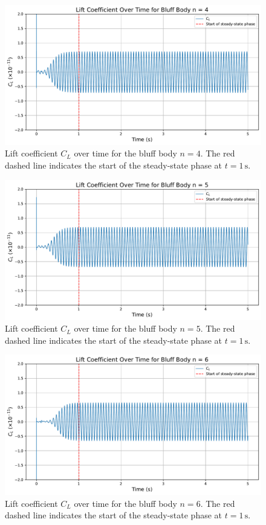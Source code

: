 \begin{figure}[H]
	\centering
	\includegraphics[width=\textwidth]{images/4face_graph}
	\caption{Lift coefficient $C_L$ over time for the bluff body $n=4$. The red dashed line indicates the start of the steady-state phase at $t = 1\,\mathrm{s}$.}
	\label{fig:4FaceGraph} 
\end{figure}

\begin{figure}[H]
	\centering
	\includegraphics[width=\textwidth]{images/5face_graph}
	\caption{Lift coefficient $C_L$ over time for the bluff body $n=5$. The red dashed line indicates the start of the steady-state phase at $t = 1\,\mathrm{s}$.}
	\label{fig:5FaceGraph} 
\end{figure}

\begin{figure}[H]
	\centering
	\includegraphics[width=\textwidth]{images/6face_graph}
	\caption{Lift coefficient $C_L$ over time for the bluff body $n=6$. The red dashed line indicates the start of the steady-state phase at $t = 1\,\mathrm{s}$.}
	\label{fig:6FaceGraph} 
\end{figure}

